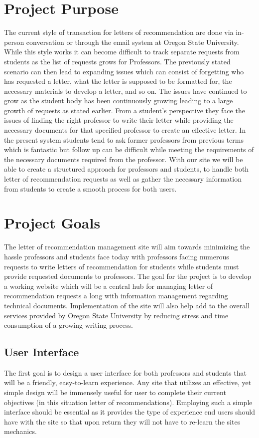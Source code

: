 \documentclass[compsoc, draftclsnofoot, onecolumn, letterpaper, 10pt]{IEEEtran}
\begin{document}
\section{Project Purpose}
The current style of transaction for letters of recommendation are done via in-person conversation or through the email system at Oregon State University. While this style works it can become difficult to track separate requests from students as the list of requests grows for Professors. The previously stated scenario can then lead to expanding issues which can consist of forgetting who has requested a letter, what the letter is supposed to be formatted for, the necessary materials to develop a letter, and so on. The issues have continued to grow as the student body has been continuously growing leading to a large growth of requests as stated earlier. From a student’s perspective they face the issues of finding the right professor to write their letter while providing the necessary documents for that specified professor to create an effective letter. In the present system students tend to ask former professors from previous terms which is fantastic but follow up can be difficult while meeting the requirements of the necessary documents required from the professor. With our site we will be able to create a structured approach for professors and students, to handle both letter of recommendation requests as well as gather the necessary information from students to create a smooth process for both users.

\section{Project Goals}
The letter of recommendation management site will aim towards minimizing the hassle professors and students face today with professors facing numerous requests to write letters of recommendation for students while students must provide requested documents to professors. The goal for the project is to develop a working website which will be a central hub for managing letter of recommendation requests a long with information management regarding technical documents. Implementation of the site will also help add to the overall services provided by Oregon State University by reducing stress and time consumption of a growing writing process.

\subsection{User Interface}
The first goal is to design a user interface for both professors and students that will be a friendly, easy-to-learn experience. Any site that utilizes an effective, yet simple design will be immensely useful for user to complete their current objectives (in this situation letter of recommendations). Employing such a simple interface should be essential as it provides the type of experience end users should have with the site so that upon return they will not have to re-learn the sites mechanics.
\end{document}
